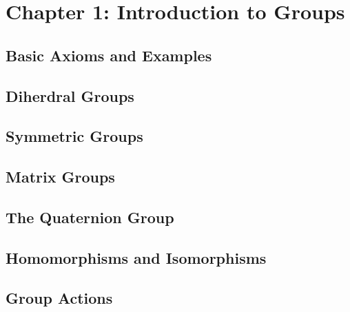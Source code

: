 \section{Chapter 1: Introduction to Groups}

\subsection{Basic Axioms and Examples}
\subsection{Diherdral Groups}
\subsection{Symmetric Groups}
\subsection{Matrix Groups}



\subsection{The Quaternion Group}
\subsection{Homomorphisms and Isomorphisms}
\subsection{Group Actions}

\newpage